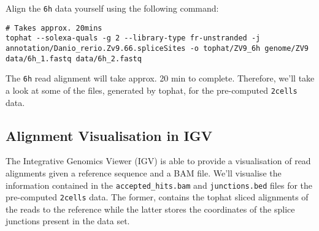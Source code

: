 \begin{steps}
Align the \texttt{6h} data yourself using the following command:  

\begin{lstlisting}
# Takes approx. 20mins
tophat --solexa-quals -g 2 --library-type fr-unstranded -j annotation/Danio_rerio.Zv9.66.spliceSites -o tophat/ZV9_6h genome/ZV9 data/6h_1.fastq data/6h_2.fastq
\end{lstlisting}

\end{steps}

The \texttt{6h} read alignment will take approx. 20 min to complete. Therefore,
we'll take a look at some of the files, generated by tophat, for the
pre-computed \texttt{2cells} data.

\subsection{Alignment Visualisation in IGV}

The Integrative Genomics Viewer (IGV) is able to provide a visualisation of read
alignments given a reference sequence and a BAM file. We'll visualise the
information contained in the \texttt{accepted\_hits.bam} and
\texttt{junctions.bed} files for the pre-computed \texttt{2cells} data. The
former, contains the tophat sliced alignments of the reads to the reference
while the latter stores the coordinates of the splice junctions present in the
data set.

